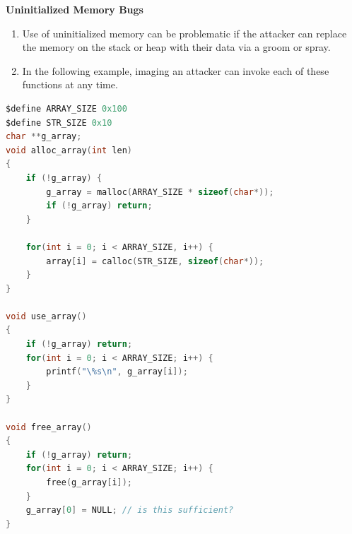 \documentclass[12pt]{Training}
\begin{document}
\textbf{Uninitialized Memory Bugs}
\begin{enumerate}
    \item Use of uninitialized memory can be problematic if the attacker can replace the memory on the stack or heap with their data via a groom or spray.
    \item In the following example, imaging an attacker can invoke each of these functions at any time.
\end{enumerate}
\begin{sectionbox}
\begin{lstlisting}[language=C, caption={Memory Used Unintialized}]
$define ARRAY_SIZE 0x100
$define STR_SIZE 0x10
char **g_array;
void alloc_array(int len)
{
    if (!g_array) {
        g_array = malloc(ARRAY_SIZE * sizeof(char*));
        if (!g_array) return;
    }

    for(int i = 0; i < ARRAY_SIZE, i++) {
        array[i] = calloc(STR_SIZE, sizeof(char*));
    }
}

void use_array()
{
    if (!g_array) return;
    for(int i = 0; i < ARRAY_SIZE; i++) {
        printf("\%s\n", g_array[i]);
    }
}

void free_array()
{
    if (!g_array) return;
    for(int i = 0; i < ARRAY_SIZE; i++) {
        free(g_array[i]);
    }
    g_array[0] = NULL; // is this sufficient?
}
\end{lstlisting}
\end{sectionbox}

\end{document}
